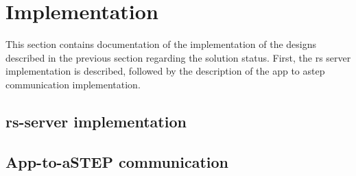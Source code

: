\section{Implementation}
This section contains documentation of the implementation of the designs described in the previous section regarding the solution status.
First, the \gls{rs} server implementation is described, followed by the description of the app to \gls{astep} communication implementation.

\subsection{\gls{rs}-server implementation}


\subsection{App-to-aSTEP communication}

